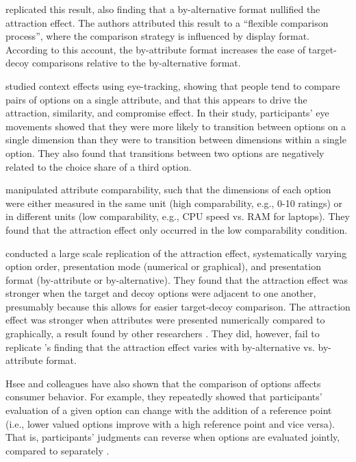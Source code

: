 \textcite{cataldoComparisonProcessAccount2019b} replicated this result, also finding that a by-alternative format nullified the attraction effect. The authors attributed this result to a “flexible comparison process”, where the comparison strategy is influenced by display format. According to this account, the by-attribute format increases the ease of target-decoy comparisons relative to the by-alternative format. 

\textcite{noguchi2014attraction} studied context effects using eye-tracking, showing that people tend to compare pairs of options on a single attribute, and that this appears to drive the attraction, similarity, and compromise effect. In their study, participants' eye movements showed that they were more likely to transition between options on a single dimension than they were to transition between dimensions within a single option. They also found that transitions between two options are negatively related to the choice share of a third option.

\textcite{hayes2024attribute} manipulated attribute comparability, such that the dimensions of each option were either measured in the same unit (high comparability, e.g., 0-10 ratings) or in different units (low comparability, e.g., CPU speed vs. RAM for laptops). They found that the attraction effect only occurred in the low comparability condition. 

\textcite{hasan2025registered} conducted a large scale replication of the attraction effect, systematically varying option order, presentation mode (numerical or graphical), and presentation format (by-attribute or by-alternative). They found that the attraction effect was stronger when the target and decoy options were adjacent to one another, presumably because this allows for easier target-decoy comparison. The attraction effect was stronger when attributes were presented numerically compared to graphically, a result found by other researchers \parencite{frederickLimitsAttraction2014b,yangMoreEvidenceChallenging2014}. They did, however, fail to replicate \textcite{cataldoComparisonProcessAccount2019b}'s finding that the attraction effect varies with by-alternative vs. by-attribute format.

Hsee and colleagues \parencite{hseeEvaluabilityHypothesisExplanation1996,hseeLessBetterWhen1998,hseeWillProductsLook1998,hsee1999preference} have also shown that the comparison of options affects consumer behavior. For example, they repeatedly showed that participants’ evaluation of a given option can change with the addition of a reference point (i.e., lower valued options improve with a high reference point and vice versa). That is, participants’ judgments can reverse when options are evaluated jointly, compared to separately \parencite{hsee1999preference}. 

